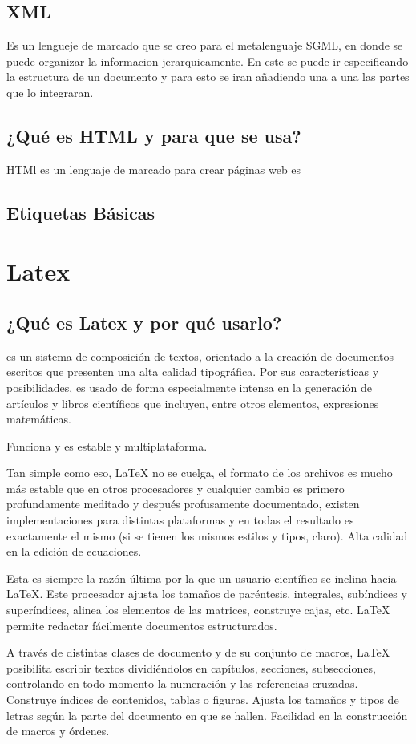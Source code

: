 \documentclass[11pt,letterpaper]{article}
\begin{document}
\subsection{XML}
Es un lengueje de marcado que se creo para el metalenguaje SGML, en donde se puede organizar la informacion jerarquicamente.
En este se puede ir especificando la estructura de un documento y para esto se iran añadiendo una a una las partes que lo integraran.
\subsection{¿Qué es HTML y para que se usa?}
HTMl es un lenguaje de marcado para crear páginas web
es\subsection{Etiquetas Básicas}

\section{Latex}
\subsection{¿Qué es Latex y por qué usarlo?}
es un sistema de composición de textos, orientado a la creación de documentos escritos que presenten una alta calidad tipográfica. Por sus características y posibilidades, es usado de forma especialmente intensa en la generación de artículos y libros científicos que incluyen, entre otros elementos, expresiones matemáticas.


Funciona y es estable y multiplataforma.

    Tan simple como eso, LaTeX no se cuelga, el formato de los archivos es mucho más estable que en otros procesadores y cualquier cambio es primero profundamente meditado y después profusamente documentado, existen implementaciones para distintas plataformas y en todas el resultado es exactamente el mismo (si se tienen los mismos estilos y tipos, claro).
Alta calidad en la edición de ecuaciones.

    Esta es siempre la razón última por la que un usuario científico se inclina hacia LaTeX. Este procesador ajusta los tamaños de paréntesis, integrales, subíndices y superíndices, alinea los elementos de las matrices, construye cajas, etc.
LaTeX permite redactar fácilmente documentos estructurados.

    A través de distintas clases de documento y de su conjunto de macros, LaTeX posibilita escribir textos dividiéndolos en capítulos, secciones, subsecciones, controlando en todo momento la numeración y las referencias cruzadas. Construye índices de contenidos, tablas o figuras. Ajusta los tamaños y tipos de letras según la parte del documento en que se hallen.
Facilidad en la construcción de macros y órdenes.
\end{document}
